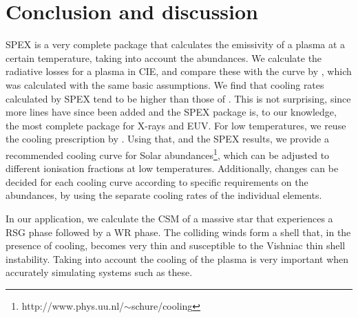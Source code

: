 \documentclass[floatfix,traditabstract,preprint2]{aa}
\begin{document}
\section{Conclusion and discussion}
\label{sec:conclusion}

SPEX is a very complete package that calculates the emissivity of a plasma at a certain temperature, taking into account the abundances. We calculate the radiative losses for a plasma in CIE, and compare these with the curve by \citet{1993SutherlandDopita}, which was calculated with the same basic assumptions. We find that cooling rates calculated by SPEX tend to be higher than those of \citet{1993SutherlandDopita}. This is not surprising, since more lines have since been added and the SPEX package is, to our knowledge, the most complete package for X-rays and EUV. For low temperatures, we reuse the cooling prescription by \citet{1972DalgarnoMcCray}. Using that, and the SPEX results, we provide a recommended cooling curve for Solar abundances\footnote{http://www.phys.uu.nl/$\sim$schure/cooling}, which can be adjusted to different ionisation fractions at low temperatures. Additionally, changes can be decided for each cooling curve according to specific requirements on the abundances, by using the separate cooling rates of the individual elements.

In our application, we calculate the CSM of a massive star that experiences a RSG phase followed by a WR phase. The colliding winds form a shell that, in the presence of cooling, becomes very thin and susceptible to the Vishniac thin shell instability. Taking into account the cooling of the plasma is very important when accurately simulating systems such as these.
\end{document}
